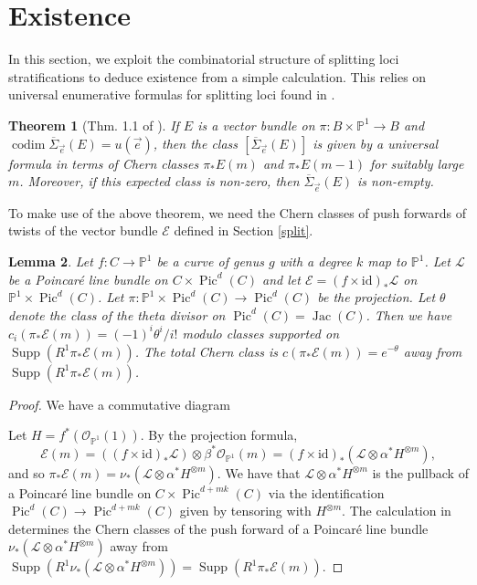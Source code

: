 \documentclass[12pt]{amsart}
\newtheorem{theorem}{Theorem}[section]
\newcommand{\pp}{\mathbb{P}}
\newcommand{\E}{\mathcal{E}}
\renewcommand{\L}{\mathcal{L}}
\renewcommand{\O}{\mathscr{O}}
\DeclareMathOperator{\codim}{codim}
\newtheorem{Lemma}[theorem]{Lemma}
\DeclareMathOperator{\Pic}{Pic}
\DeclareMathOperator{\Supp}{Supp}
\DeclareMathOperator{\Jac}{Jac}
\newcommand{\Sigmabar}{\overline{\Sigma}}
\theoremstyle{definition}
\theoremstyle{remark}
\theoremstyle{remark}
\numberwithin{equation}{section}
\begin{document}
 
 \section{Existence} \label{existence}

In this section, we exploit the combinatorial structure of splitting loci stratifications to deduce existence from a simple calculation.
This relies on universal enumerative formulas for splitting loci found in \cite{L}. 

\begin{theorem}[Thm. 1.1 of \cite{L}] \label{mine}
If $E$ is a vector bundle on $\pi: B \times \pp^1 \rightarrow B$ and $\codim \Sigmabar_{\vec{e}}(E) = u(\vec{e})$, then the class $[\Sigmabar_{\vec{e}}(E)]$ is given by a universal formula in terms of Chern classes $\pi_* E(m)$ and $\pi_*E(m-1)$ for suitably large $m$. Moreover, if this expected class is non-zero, then $\Sigmabar_{\vec{e}}(E)$ is non-empty.
\end{theorem}

To make use of the above theorem, we need the Chern classes of push forwards of twists of the vector bundle $\E$ defined in Section \ref{split}.

\begin{Lemma} \label{cE}
Let $f\colon  C \rightarrow \pp^1$ be a curve of genus $g$ with a degree $k$ map to $\pp^1$. 
Let $\mathcal{L}$ be a Poincar\'e line bundle on $C \times \Pic^d(C)$ and let $\E = (f \times \mathrm{id})_* \mathcal{L}$ on $\pp^1 \times \Pic^d(C)$. Let $\pi: \pp^1 \times \Pic^d(C) \rightarrow \Pic^d(C)$ be the projection.
Let $\theta$ denote the class of the theta divisor on $\Pic^d(C) = \Jac(C)$.
Then we have $c_i(\pi_*\E(m)) = (-1)^i\theta^i/i!$ modulo classes supported on $\Supp(R^1\pi_*\E(m))$. The total Chern class is $c(\pi_*\E(m)) = e^{-\theta}$ away from $\Supp(R^1\pi_*\E(m))$.
\end{Lemma}
\begin{proof}
We have a commutative diagram
\begin{center}
\end{center}
Let $H = f^*(\O_{\pp^1}(1))$.
By the projection formula, 
\[\E(m) = ((f\times \mathrm{id})_* \L) \otimes \beta^* \O_{\pp^1}(m) =(f \times \mathrm{id})_*(\L \otimes \alpha^* H^{\otimes m}),\]
and so $\pi_*\E(m) = \nu_*(\L \otimes \alpha^* H^{\otimes m})$. We have that $\L \otimes \alpha^*H^{\otimes m}$ is the pullback of a Poincar\'e line bundle on $C \times \Pic^{d+mk}(C)$ via the identification $\Pic^d(C) \rightarrow \Pic^{d+mk}(C)$ given by tensoring with $H^{\otimes m}$. The calculation in \cite[p. 336]{ACGH} determines the Chern classes of the push forward of a Poincar\'e line bundle $\nu_*(\L \otimes \alpha^*H^{\otimes m})$ away from $\Supp(R^1\nu_*(\L \otimes \alpha^*H^{\otimes m})) = \Supp(R^1 \pi_*\E(m))$.
\end{proof}
\end{document}
